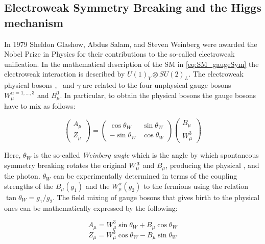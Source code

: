 		\subsection{Electroweak Symmetry Breaking and the Higgs mechanism}
		\label{sec:ewksb}

			In 1979 Sheldon Glashow, Abdus Salam, and Steven Weinberg were awarded the Nobel Prize in Physics for their contributions to the so-called electroweak unification. In the mathematical description of the SM in \ref{eq:SM_gaugeSym} the electroweak interaction is described by $U(1)_Y \otimes SU(2)_L$. The electroweak physical bosons \Wboson, \Zboson\ and $\gamma$ are related to the four unphysical gauge bosons $W_{\mu}^{\alpha = 1,\dots,3}$ and $B_\mu^0$. In particular, to obtain the physical bosons the gauge bosons have to mix as follows:

			\begin{equation}
			\label{eq:mixing}
					\begin{pmatrix} A_{\mu} \\ Z_{\mu} \end{pmatrix}					
					= 
					\begin{pmatrix}
							\cos\theta_W & \sin\theta_W \\ 
							-\sin\theta_W & \cos\theta_W
						\end{pmatrix}
					\begin{pmatrix}
						B_{\mu} \\ W_{\mu}^3
						\end{pmatrix}
			\end{equation}

			Here, $\theta_W$ is the so-called \emph{Weinberg angle} which is the angle by which spontaneous symmetry breaking rotates the original $W_{\mu}^3$ and $B_{\mu}$, producing the physical \Zboson, and the photon. $\theta_W$ can be experimentally determined in terms of the coupling strengths of the $B_{\mu}(g_1)$ and the $W_{\mu}^\alpha (g_2)$ to the fermions using the relation $\tan\theta_W = g_1 / g_2 $. The field mixing of gauge bosons that gives birth to the physical ones can be mathematically expressed by the following:

			\begin{equation}
			\label{eq:photon}
				A_{\mu} = W_{\mu}^3 \sin\theta_W  + B_{\mu}\cos \theta_W 
			\end{equation}
			\begin{equation}
			\label{eq:Zboson}
				Z_{\mu} = W_{\mu}^3\cos\theta_W  - B_{\mu} \sin \theta_W
			\end{equation}

